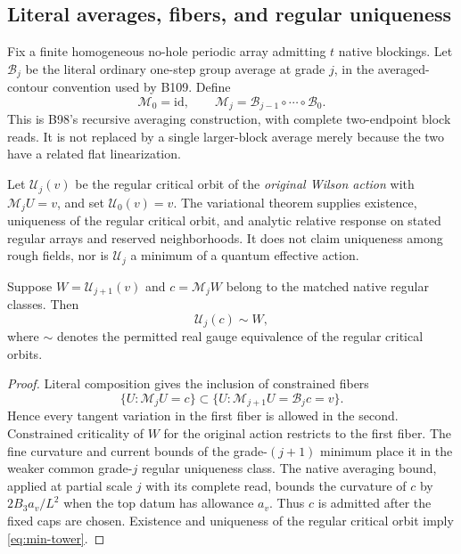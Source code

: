 \subsection{Literal averages, fibers, and regular uniqueness}

Fix a finite homogeneous no-hole periodic array admitting $t$ native blockings. Let $\mathcal B_j$ be the literal ordinary one-step group average at grade $j$, in the averaged-contour convention used by B109. Define
\begin{equation}\label{eq:recursive-average}
 \mathcal M_0=\mathrm{id},\qquad
 \mathcal M_j=\mathcal B_{j-1}\circ\cdots\circ\mathcal B_0.
\end{equation}
This is B98's recursive averaging construction, with complete two-endpoint block reads. It is not replaced by a single larger-block average merely because the two have a related flat linearization.

Let $\mathcal U_j(v)$ be the regular critical orbit of the \emph{original Wilson action} with $\mathcal M_jU=v$, and set $\mathcal U_0(v)=v$. The variational theorem \cite[Theorem 1 and Section G]{B102} supplies existence, uniqueness of the regular critical orbit, and analytic relative response on stated regular arrays and reserved neighborhoods. It does not claim uniqueness among rough fields, nor is $\mathcal U_j$ a minimum of a quantum effective action.

\begin{lemma}\label{lem:tower}
Suppose $W=\mathcal U_{j+1}(v)$ and $c=\mathcal M_jW$ belong to the matched native regular classes. Then
\begin{equation}\label{eq:min-tower}
 \mathcal U_j(c)\sim W,
\end{equation}
where $\sim$ denotes the permitted real gauge equivalence of the regular critical orbits.
\end{lemma}

\begin{proof}
Literal composition gives the inclusion of constrained fibers
\[
 \{U:\mathcal M_jU=c\}\subset
 \{U:\mathcal M_{j+1}U=\mathcal B_jc=v\}.
\]
Hence every tangent variation in the first fiber is allowed in the second. Constrained criticality of $W$ for the original action restricts to the first fiber. The fine curvature and current bounds of the grade-$(j+1)$ minimum place it in the weaker common grade-$j$ regular uniqueness class. The native averaging bound, applied at partial scale $j$ with its complete read, bounds the curvature of $c$ by $2B_3a_v/L^2$ when the top datum has allowance $a_v$. Thus $c$ is admitted after the fixed caps are chosen. Existence and uniqueness of the regular critical orbit imply \eqref{eq:min-tower}.
\end{proof}

